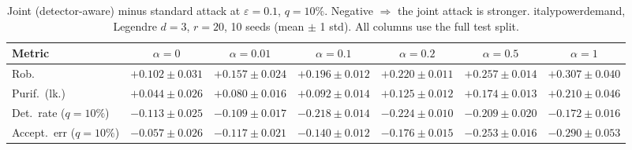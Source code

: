 \begin{table}[htbp]
  \centering
  \small
  \begin{tabular}{@{}lcccccc@{}}
    \toprule
    Metric & $\alpha{=}0$ & $\alpha{=}0.01$ & $\alpha{=}0.1$ & $\alpha{=}0.2$ & $\alpha{=}0.5$ & $\alpha{=}1$ \\
    \midrule
    Rob. & $+0.102 \pm 0.031$ & $+0.157 \pm 0.024$ & $+0.196 \pm 0.012$ & $+0.220 \pm 0.011$ & $+0.257 \pm 0.014$ & $+0.307 \pm 0.040$ \\
    Purif.\ (lk.) & $+0.044 \pm 0.026$ & $+0.080 \pm 0.016$ & $+0.092 \pm 0.014$ & $+0.125 \pm 0.012$ & $+0.174 \pm 0.013$ & $+0.210 \pm 0.046$ \\
    Det.\ rate ($q{=}10\%$) & $-0.113 \pm 0.025$ & $-0.109 \pm 0.017$ & $-0.218 \pm 0.014$ & $-0.224 \pm 0.010$ & $-0.209 \pm 0.020$ & $-0.172 \pm 0.016$ \\
    Accept.\ err ($q{=}10\%$) & $-0.057 \pm 0.026$ & $-0.117 \pm 0.021$ & $-0.140 \pm 0.012$ & $-0.176 \pm 0.015$ & $-0.253 \pm 0.016$ & $-0.290 \pm 0.053$ \\
    \bottomrule
  \end{tabular}
  \caption{Joint (detector-aware) minus standard attack at $\varepsilon=0.1$, $q{=}10\%$. Negative $\Rightarrow$ the joint attack is stronger. italypowerdemand, Legendre $d{=}3$, $r{=}20$, 10 seeds (mean $\pm$ 1 std). All columns use the full test split.}
  \label{tab:italypowerdemand_joint_r20_eps0.1}
\end{table}
